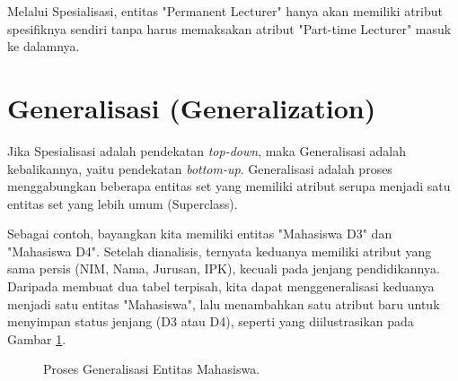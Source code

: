 \documentclass[11pt,a4paper]{article}
\begin{document}
Melalui Spesialisasi, entitas "Permanent Lecturer" hanya akan memiliki atribut spesifiknya sendiri tanpa harus memaksakan atribut "Part-time Lecturer" masuk ke dalamnya.

\section{Generalisasi (Generalization)}

Jika Spesialisasi adalah pendekatan \textit{top-down}, maka Generalisasi adalah kebalikannya, yaitu pendekatan \textit{bottom-up}. Generalisasi adalah proses menggabungkan beberapa entitas set yang memiliki atribut serupa menjadi satu entitas set yang lebih umum (Superclass).

Sebagai contoh, bayangkan kita memiliki entitas "Mahasiswa D3" dan "Mahasiswa D4". Setelah dianalisis, ternyata keduanya memiliki atribut yang sama persis (NIM, Nama, Jurusan, IPK), kecuali pada jenjang pendidikannya. Daripada membuat dua tabel terpisah, kita dapat menggeneralisasi keduanya menjadi satu entitas "Mahasiswa", lalu menambahkan satu atribut baru untuk menyimpan status jenjang (D3 atau D4), seperti yang diilustrasikan pada Gambar \ref{fig:generalization}.

\begin{figure}[H]
	\centering
	\caption{Proses Generalisasi Entitas Mahasiswa.}
	\label{fig:generalization}
\end{figure}
\end{document}
